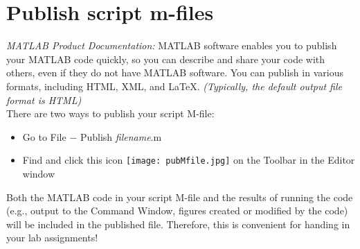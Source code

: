 \documentclass[12pt]{article}
\begin{document}



\section{Publish script m-files}
\textit{MATLAB Product Documentation:} MATLAB software enables you to publish your MATLAB code quickly, so you can describe and share your code with others, even if they do not have MATLAB software. You can publish in various formats, including HTML, XML, and LaTeX. \textit{(Typically, the default output file format is HTML)}\\

There are two ways to publish your script M-file:
\begin{itemize}
\item Go to File $-$ Publish \textit{filename}.m
\item Find and click this icon \texttt{[image: pubMfile.jpg]} on the Toolbar in the Editor window
\end{itemize}

Both the MATLAB code in your script M-file and the results of running the code (e.g., output to the Command Window, figures created or modified by the code) will be included in the published file. Therefore, this is convenient for handing in your lab assignments!
\end{document}
